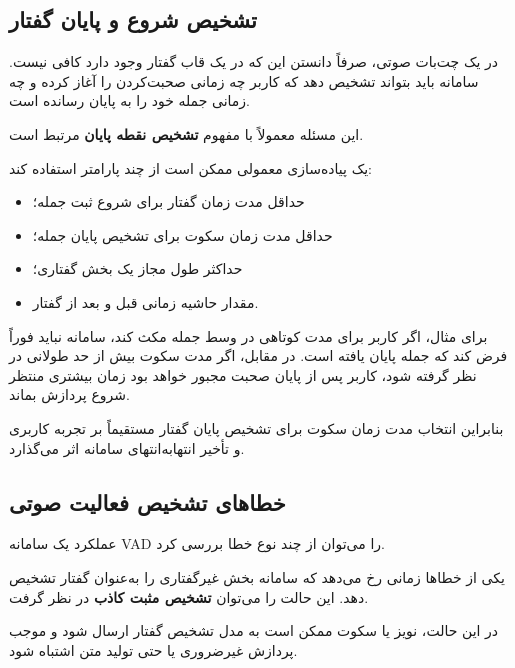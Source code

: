 \subsection{تشخیص شروع و پایان گفتار}

در یک چت‌بات صوتی، صرفاً دانستن این که در یک قاب گفتار وجود
دارد کافی نیست.
سامانه باید بتواند تشخیص دهد که کاربر چه زمانی صحبت‌کردن را
آغاز کرده و چه زمانی جمله خود را به پایان رسانده است.

این مسئله معمولاً با مفهوم
\textbf{تشخیص نقطه پایان}
مرتبط است.

یک پیاده‌سازی معمولی ممکن است از چند پارامتر استفاده کند:

\begin{itemize}

    \item حداقل مدت زمان گفتار برای شروع ثبت جمله؛

    \item حداقل مدت زمان سکوت برای تشخیص پایان جمله؛

    \item حداکثر طول مجاز یک بخش گفتاری؛

    \item مقدار حاشیه زمانی قبل و بعد از گفتار.

\end{itemize}

برای مثال، اگر کاربر برای مدت کوتاهی در وسط جمله مکث کند،
سامانه نباید فوراً فرض کند که جمله پایان یافته است.
در مقابل، اگر مدت سکوت بیش از حد طولانی در نظر گرفته شود،
کاربر پس از پایان صحبت مجبور خواهد بود زمان بیشتری منتظر
شروع پردازش بماند.

بنابراین انتخاب مدت زمان سکوت برای تشخیص پایان گفتار مستقیماً
بر تجربه کاربری و تأخیر انتهابه‌انتهای سامانه اثر می‌گذارد.


\subsection{خطاهای تشخیص فعالیت صوتی}

عملکرد یک سامانه VAD را می‌توان از چند نوع خطا بررسی کرد.

یکی از خطاها زمانی رخ می‌دهد که سامانه بخش غیرگفتاری را
به‌عنوان گفتار تشخیص دهد.
این حالت را می‌توان
\textbf{تشخیص مثبت کاذب}
در نظر گرفت.

در این حالت، نویز یا سکوت ممکن است به مدل تشخیص گفتار ارسال
شود و موجب پردازش غیرضروری یا حتی تولید متن اشتباه شود.

